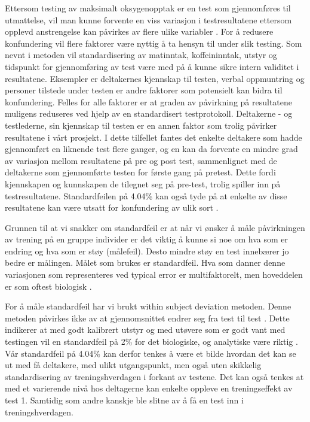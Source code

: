 \documentclass[
]{book}
\begin{document}
Ettersom testing av maksimalt oksygenopptak er en test som gjennomføres
til utmattelse, vil man kunne forvente en viss variasjon i
testresultatene ettersom opplevd anstrengelse kan påvirkes av flere
ulike variabler \citep{halperin2015}. For å redusere
konfundering
vil flere faktorer være nyttig å ta hensyn til under slik testing. Som
nevnt i metoden vil standardisering av matinntak, koffeininntak, utstyr
og tidspunkt for gjennomføring av test være med på å kunne sikre intern
validitet i resultatene. Eksempler er deltakernes kjennskap til testen,
verbal oppmuntring og personer tilstede under testen er andre faktorer
som potensielt kan bidra til konfundering. Felles for alle faktorer er
at graden av påvirkning på resultatene muligens reduseres ved hjelp av
en standardisert testprotokoll. Deltakerne - og testlederne, sin
kjennskap til testen er en annen faktor som trolig påvirker resultatene
i vårt prosjekt. I dette tilfellet fantes det enkelte deltakere som
hadde gjennomført en liknende test flere ganger, og en kan da forvente
en mindre grad av variasjon mellom resultatene på pre og post test,
sammenlignet med de deltakerne som gjennomførte testen for første gang
på pretest. Dette fordi kjennskapen og kunnskapen de tilegnet seg på
pre-test, trolig spiller inn på testresultatene.
Standardfeilen
på 4.04\% kan også tyde på at enkelte av disse resultatene kan være
utsatt for konfundering av ulik sort \citep{hopkins2000}.

Grunnen til at vi snakker om standardfeil er at når vi ønsker å måle
påvirkningen av trening på en gruppe individer er det viktig å kunne si
noe om hva som er endring og hva som er støy (målefeil). Desto mindre
støy en test innebærer jo bedre er målingen. Målet som brukes er
standardfeil. Hva som danner denne variasjonen som representeres ved
typical error er multifaktorelt, men hoveddelen er som oftest biologisk
\citep{hopkins2000}.

For å måle standardfeil har vi brukt within subject deviation metoden.
Denne metoden påvirkes ikke av at gjennomsnittet endrer seg fra test til
test \citetext{\citealp[. Data for målinger i VO2max fra fem sertifiserte
Australske laboratorier fastslo ett gjennomsnitt på 2.2\% for
standardfeil \[@halperin2015\]. Data fra det Australske institutt for
sport har også fastslått at en standardfeil på omtrent 2\% er riktig for
både maksimal og submaksimal VO2 {[}\citet{clark2007}]{hopkins2000}; \citealp{robertson2010}; \citealp{saunders2009}}. Dette indikerer at med godt kalibrert utstyr og med
utøvere som er godt vant med testingen vil en standardfeil på 2\% for det
biologiske, og analytiske være riktig \citep{halperin2015}. Vår standardfeil
på 4.04\% kan derfor tenkes å være et bilde hvordan det kan se ut med få
deltakere, med ulikt utgangspunkt, men også uten skikkelig
standardisering av treningshverdagen i forkant av testene. Det kan også
tenkes at med et varierende nivå hos deltagerne kan enkelte oppleve en
treningseffekt av test 1. Samtidig som andre kanskje ble slitne av å få
en test inn i treningshverdagen.
\end{document}
